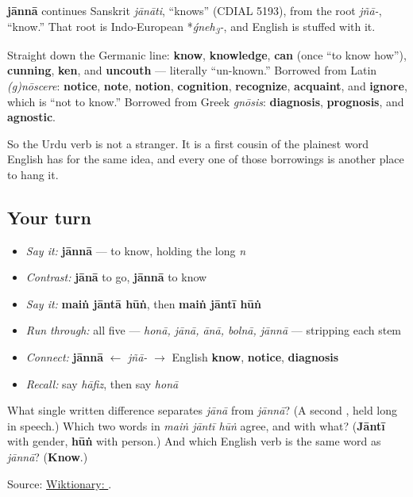 \begin{cousinweb}
\textbf{jānnā} continues Sanskrit \emph{jānāti}, “knows” (CDIAL 5193), from the root \emph{jñā-}, “know.” That root is Indo-European *\emph{ǵneh\textsubscript{3}-}, and English is stuffed with it.

Straight down the Germanic line: \textbf{know}, \textbf{knowledge}, \textbf{can} (once “to know how”), \textbf{cunning}, \textbf{ken}, and \textbf{uncouth} — literally “un-known.” Borrowed from Latin \emph{(g)nōscere}: \textbf{notice}, \textbf{note}, \textbf{notion}, \textbf{cognition}, \textbf{recognize}, \textbf{acquaint}, and \textbf{ignore}, which is “not to know.” Borrowed from Greek \emph{gnōsis}: \textbf{diagnosis}, \textbf{prognosis}, and \textbf{agnostic}.

So the Urdu verb is not a stranger. It is a first cousin of the plainest word English has for the same idea, and every one of those borrowings is another place to hang it.
\end{cousinweb}

\subsection*{Your turn}
\begin{itemize}
\raggedright
  \item \emph{Say it:} \textbf{jānnā} — to know, holding the long \emph{n}
  \item \emph{Contrast:} \textbf{jānā} to go, \textbf{jānnā} to know
  \item \emph{Say it:} \textbf{maiṅ jāntā hūṅ}, then \textbf{maiṅ jāntī hūṅ}
  \item \emph{Run through:} all five — \emph{honā, jānā, ānā, bolnā, jānnā} — stripping each stem
  \item \emph{Connect:} \textbf{jānnā} $\leftarrow$ \emph{jñā-} $\to$ English \textbf{know}, \textbf{notice}, \textbf{diagnosis}
  \item \emph{Recall:} say \emph{hāfiz}, then say \emph{honā}
\end{itemize}

\begin{tcolorbox}[breakable,colback=teal!4,colframe=teal!35!black,title={Before you move on}]
What single written difference separates \emph{jānā} from \emph{jānnā}? (A second \textbf{}, held long in speech.) Which two words in \emph{maiṅ jāntī hūṅ} agree, and with what? (\textbf{Jāntī} with gender, \textbf{hūṅ} with person.) And which English verb is the same word as \emph{jānnā}? (\textbf{Know}.)

Source: \href{https://en.wiktionary.org/wiki/\%D8\%AC\%D8\%A7\%D9\%86\%D9\%86\%D8\%A7\#Urdu}{Wiktionary: }.
\end{tcolorbox}
